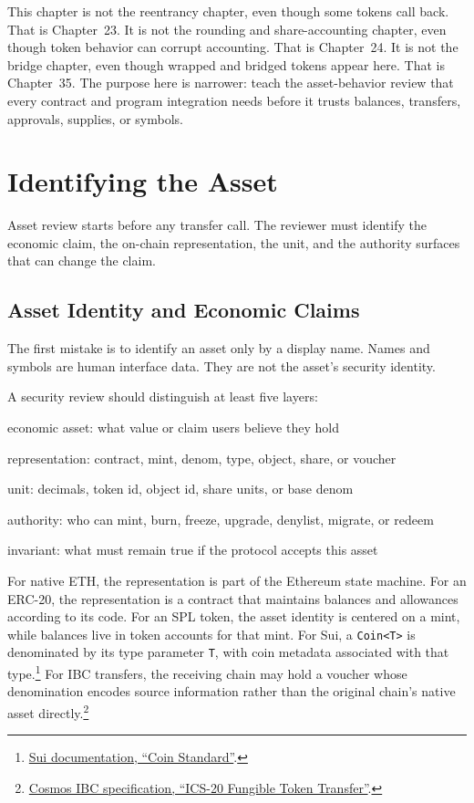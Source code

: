 This chapter is not the reentrancy chapter, even though some tokens call back. That is Chapter~23. It is not the rounding and share-accounting chapter, even though token behavior can corrupt accounting. That is Chapter~24. It is not the bridge chapter, even though wrapped and bridged tokens appear here. That is Chapter~35. The purpose here is narrower: teach the asset-behavior review that every contract and program integration needs before it trusts balances, transfers, approvals, supplies, or symbols.

\section{Identifying the Asset}

Asset review starts before any transfer call. The reviewer must identify the economic claim, the on-chain representation, the unit, and the authority surfaces that can change the claim.

\subsection{Asset Identity and Economic Claims}

The first mistake is to identify an asset only by a display name. Names and symbols are human interface data. They are not the asset's security identity.

A security review should distinguish at least five layers:

\begin{codeblock}
economic asset:
    what value or claim users believe they hold

representation:
    contract, mint, denom, type, object, share, or voucher

unit:
    decimals, token id, object id, share units, or base denom

authority:
    who can mint, burn, freeze, upgrade, denylist, migrate, or redeem

invariant:
    what must remain true if the protocol accepts this asset
\end{codeblock}

For native ETH, the representation is part of the Ethereum state machine. For an ERC-20, the representation is a contract that maintains balances and allowances according to its code. For an SPL token, the asset identity is centered on a mint, while balances live in token accounts for that mint. For Sui, a \texttt{Coin<T>} is denominated by its type parameter \texttt{T}, with coin metadata associated with that type.\footnote{\href{https://docs.sui.io/onchain-finance/fungible-tokens/coin}{Sui documentation, ``Coin Standard''}.} For IBC transfers, the receiving chain may hold a voucher whose denomination encodes source information rather than the original chain's native asset directly.\footnote{\href{https://github.com/cosmos/ibc/blob/main/spec/app/ics-020-fungible-token-transfer/README.md}{Cosmos IBC specification, ``ICS-20 Fungible Token Transfer''}.}

